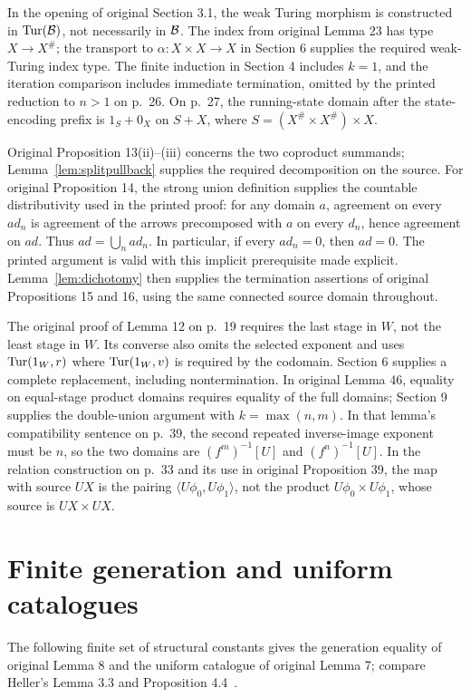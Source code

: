 \documentclass[11pt]{article}
\begin{document}
In the opening of original Section 3.1, the weak Turing morphism is constructed in $\operatorname{Tur}(\mathcal B)$, not necessarily in $\mathcal B$. The index from original Lemma 23 has type $X\to X^\#$; the transport to $\alpha:X\times X\to X$ in Section 6 supplies the required weak-Turing index type. The finite induction in Section 4 includes $k=1$, and the iteration comparison includes immediate termination, omitted by the printed reduction to $n>1$ on p.~26. On p.~27, the running-state domain after the state-encoding prefix is $1_S+0_X$ on $S+X$, where $S=(X^\#\times X^\#)\times X$.

Original Proposition 13(ii)--(iii) concerns the two coproduct summands; Lemma~\ref{lem:splitpullback} supplies the required decomposition on the source. For original Proposition 14, the strong union definition supplies the countable distributivity used in the printed proof: for any domain $a$, agreement on every $ad_n$ is agreement of the arrows precomposed with $a$ on every $d_n$, hence agreement on $ad$. Thus $ad=\bigcup_n ad_n$. In particular, if every $ad_n=0$, then $ad=0$. The printed argument is valid with this implicit prerequisite made explicit. Lemma~\ref{lem:dichotomy} then supplies the termination assertions of original Propositions 15 and 16, using the same connected source domain throughout.

The original proof of Lemma 12 on p.~19 requires the last stage in $W$, not the least stage in $W$. Its converse also omits the selected exponent and uses $\operatorname{Tur}(1_W,r)$ where $\operatorname{Tur}(1_W,v)$ is required by the codomain. Section 6 supplies a complete replacement, including nontermination. In original Lemma 46, equality on equal-stage product domains requires equality of the full domains; Section 9 supplies the double-union argument with $k=\max(n,m)$. In that lemma's compatibility sentence on p.~39, the second repeated inverse-image exponent must be $n$, so the two domains are $(f^m)^{-1}[U]$ and $(f^n)^{-1}[U]$. In the relation construction on p.~33 and its use in original Proposition 39, the map with source $UX$ is the pairing $\langle U\phi_0,U\phi_1\rangle$, not the product $U\phi_0\times U\phi_1$, whose source is $UX\times UX$.

\appendix
\section{Finite generation and uniform catalogues}\label{sec:catalogue}
The following finite set of structural constants gives the generation equality of original Lemma 8 and the uniform catalogue of original Lemma 7; compare Heller's Lemma 3.3 and Proposition 4.4~\cite{H}.
\end{document}
